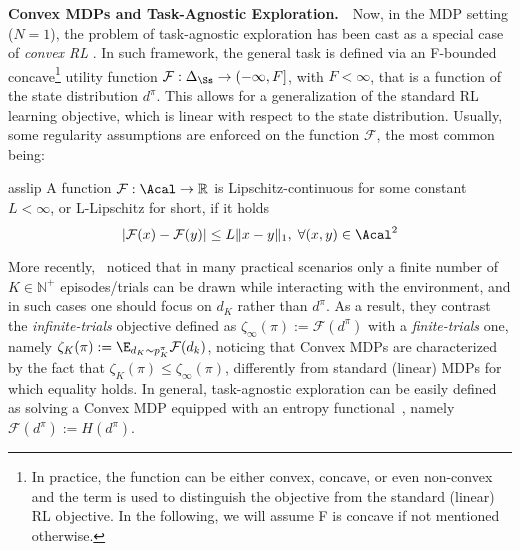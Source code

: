 \textbf{Convex MDPs and Task-Agnostic Exploration.}~~Now, in the MDP setting ($N={1}$), the problem of task-agnostic exploration has been cast as a special case of \emph{convex RL} \cite{hazan2019provably, zhang2020variationalpolicygradientmethod,zahavy2023rewardconvexmdps}. In such framework, the general task is defined via an F-bounded concave\footnote{In practice, the function can be either convex, concave, or even non-convex and the term is used to distinguish the objective from the standard (linear) RL objective. In the following, we will assume F is concave if not mentioned otherwise.} utility function $\mathcal F : \Delta_{\Ss} \rightarrow (-\infty,F]$, with $F < \infty$, that is a function of the state distribution $d^\pi$. This allows for a generalization of the standard RL learning objective, which is linear with respect to the state distribution. Usually, some regularity assumptions are enforced on the function $\mathcal F$, the most common being:
\begin{restatable}[Lipschitz]{ass}{lip}
    \label{thr:lip} 
    A function $\mathcal F : \Acal \rightarrow \mathbb R$ is Lipschitz-continuous for some constant $L < \infty$, or L-Lipschitz for short, if it holds
    \vspace{-2pt}
    \begin{equation*}
        |\mathcal F(x) - \mathcal F(y)| \leq L \|x - y\|_1, \; \forall (x,y) \in \Acal^2
    \end{equation*}
\end{restatable}
\vspace{-8pt}
More recently,~\citet{mutti2023challengingcommonassumptionsconvex} noticed that in many practical scenarios only a finite number of $K\in \mathbb N^+$ episodes/trials can be drawn while interacting with the environment, and in such cases one should focus on $d_K$ rather than $d^\pi$. As a result, they contrast the \emph{infinite-trials} objective defined as $\zeta_\infty(\pi) :=\mathcal F(d^\pi)$ with a \emph{finite-trials} one, namely $\zeta_K(\pi) := \E_{d_K\sim p^\pi_K}\mathcal F (d_k)$, noticing that Convex MDPs are characterized by the fact that $\zeta_K(\pi) \leq \zeta_\infty(\pi)$, differently from standard (linear) MDPs for which equality holds. In general, task-agnostic exploration can be easily defined as solving a Convex MDP equipped with an entropy functional~\cite{hazan2019provably}, namely $\mathcal F(d^\pi) := H(d^\pi)$.
